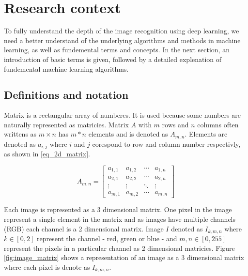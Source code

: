 \documentclass[times, utf8, diplomski]{fer}
\begin{document}
\chapter{Research context}
To fully understand the depth of the image recognition using deep learning, we need a better understand of the underlying algorithms and methods in machine learning, as well as fundemental terms and concepts. In the next section, an introduction of basic terms is given, followed by a detailed explenation of fundemental machine learning algorithms.

\section{Definitions and notation}
Matrix is a rectangular array of numberes. It is used because some numbers are naturally represented as matricies. Matrix $A$ with $m$ rows and $n$ columns often writtens as $m \times n$ has $m*n$ elements and is denoted as $A_{m,n}$. Elements are denoted as $a_{i,j}$ where $i$ and $j$ corespond to row and column number respectivly, as shown in \ref{eq_2d_matrix}. 

\begin{equation} \label{eq_2d_matrix}
A_{m,n} = 
 \begin{bmatrix}
  a_{1,1} & a_{1,2} & \cdots & a_{1,n} \\
  a_{2,1} & a_{2,2} & \cdots & a_{2,n} \\
  \vdots  & \vdots  & \ddots & \vdots  \\
  a_{m,1} & a_{m,2} & \cdots & a_{m,n} 
 \end{bmatrix}
\end{equation}


Each image is represented as a 3 dimensional matrix. One pixel in the image represent a single element in the matrix and as images have multiple channels (RGB) each channel is a 2 dimensional matrix. Image $I$ denoted as $I_{k,m,n}$ where $k\in[0,2]$ represent the channel - red, green or blue - and $m,n\in[0,255]$ represent the pixels in a particular channel as 2 dimensional matricies. Figure \ref{fig:image_matrix} shows a representation of an image as a 3 dimensional matrix where each pixel is denote as $I_{k,m,n}$.
\end{document}
